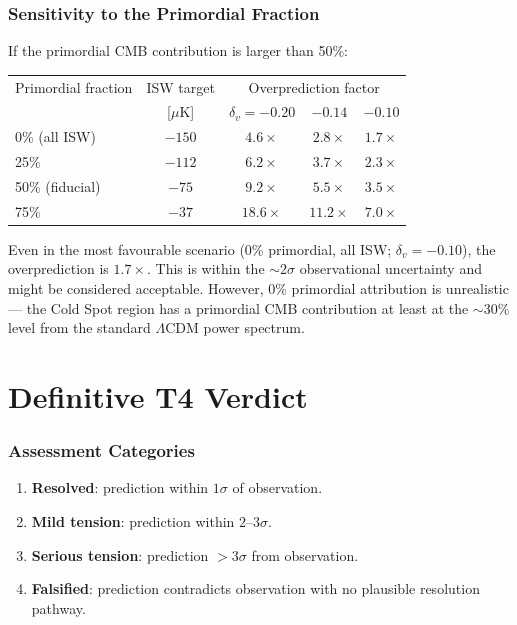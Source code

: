 \documentclass[11pt,a4paper]{article}
\begin{document}
\section{Sensitivity to the Primordial Fraction}

If the primordial CMB contribution is larger than 50\%:
\begin{center}
\begin{tabular}{lcccc}
\toprule
Primordial fraction & ISW target & \multicolumn{3}{c}{Overprediction factor} \\
& [$\mu$K] & $\delta_v = -0.20$ & $-0.14$ & $-0.10$ \\
\midrule
0\% (all ISW) & $-150$ & $4.6\times$ & $2.8\times$ & $1.7\times$ \\
25\% & $-112$ & $6.2\times$ & $3.7\times$ & $2.3\times$ \\
50\% (fiducial) & $-75$ & $9.2\times$ & $5.5\times$ & $3.5\times$ \\
75\% & $-37$ & $18.6\times$ & $11.2\times$ & $7.0\times$ \\
\bottomrule
\end{tabular}
\end{center}

Even in the most favourable scenario (0\% primordial, all ISW;
$\delta_v = -0.10$), the overprediction is $1.7\times$. This is
within the $\sim 2\sigma$ observational uncertainty and might be
considered acceptable. However, 0\% primordial attribution is
unrealistic --- the Cold Spot region has a primordial CMB contribution
at least at the $\sim 30\%$ level from the standard $\Lambda$CDM
power spectrum.


\part{Definitive T4 Verdict}
\label{part:verdict}

\section{Assessment Categories}

\begin{enumerate}
\item \textbf{Resolved}: prediction within $1\sigma$ of observation.
\item \textbf{Mild tension}: prediction within $2$--$3\sigma$.
\item \textbf{Serious tension}: prediction $>3\sigma$ from observation.
\item \textbf{Falsified}: prediction contradicts observation with
  no plausible resolution pathway.
\end{enumerate}
\end{document}

